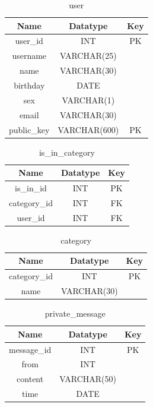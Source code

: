 \begin{table}[!ht]
\caption{user}
\centering
\begin{tabular}{c c c}
\hline\hline
Name               & Datatype    & Key \\
\hline
user\_id           & INT          & PK \\  %
username           & VARCHAR(25)  &    \\
name               & VARCHAR(30)  &    \\
birthday           & DATE         &    \\
sex                & VARCHAR(1)   &    \\
email              & VARCHAR(30)  &    \\
public\_key        & VARCHAR(600)   & PK \\
\hline
\end{tabular}
\label{table:nonlin}
\end{table}

\begin{table}[!ht]
\caption{is\_in\_category}
\centering
\begin{tabular}{c c c}
\hline\hline
Name               & Datatype    & Key \\
\hline
is\_in\_id         & INT     & PK   \\
category\_id       & INT     & FK   \\
user\_id           & INT     & FK   \\
\hline
\end{tabular}
\label{table:nonlin}
\end{table}

\begin{table}[!ht]
\caption{category}
\centering
\begin{tabular}{c c c}
\hline\hline
Name               & Datatype    & Key \\
\hline
category\_id       & INT         & PK  \\
name               & VARCHAR(30) &     \\
\hline
\end{tabular}
\label{table:nonlin}
\end{table}


\begin{table}[!ht]
\caption{private\_message}
\centering
\begin{tabular}{c c c}
\hline\hline
Name               & Datatype    & Key \\
\hline
message\_id        & INT         & PK  \\
from               & INT         &     \\
content            & VARCHAR(50) &     \\
time               & DATE        &     \\
\hline
\end{tabular}
\label{table:nonlin}
\end{table}

